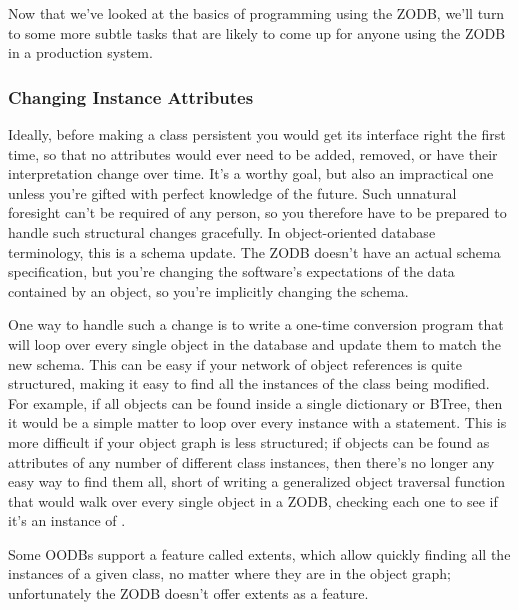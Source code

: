 Now that we've looked at the basics of programming using the ZODB,
we'll turn to some more subtle tasks that are likely to come up for
anyone using the ZODB in a production system.

\subsubsection{Changing Instance Attributes}

Ideally, before making a class persistent you would get its interface
right the first time, so that no attributes would ever need to be
added, removed, or have their interpretation change over time.  It's a
worthy goal, but also an impractical one unless you're gifted with
perfect knowledge of the future.  Such unnatural foresight can't be
required of any person, so you therefore have to be prepared to handle
such structural changes gracefully.  In object-oriented database
terminology, this is a schema update.  The ZODB doesn't have an actual
schema specification, but you're changing the software's expectations
of the data contained by an object, so you're implicitly changing the
schema.

One way to handle such a change is to write a one-time conversion
program that will loop over every single object in the database and
update them to match the new schema.  This can be easy if your network
of object references is quite structured, making it easy to find all
the instances of the class being modified.  For example, if all
 objects can be found inside a single dictionary or
BTree, then it would be a simple matter to loop over every
 instance with a  statement.
This is more difficult if your object graph is less structured; if
 objects can be found as attributes of any number of
different class instances, then there's no longer any easy way to find
them all, short of writing a generalized object traversal function
that would walk over every single object in a ZODB, checking each one
to see if it's an instance of .  

Some OODBs support a feature called extents, which allow quickly
finding all the instances of a given class, no matter where they are
in the object graph; unfortunately the ZODB doesn't offer extents as a
feature.


